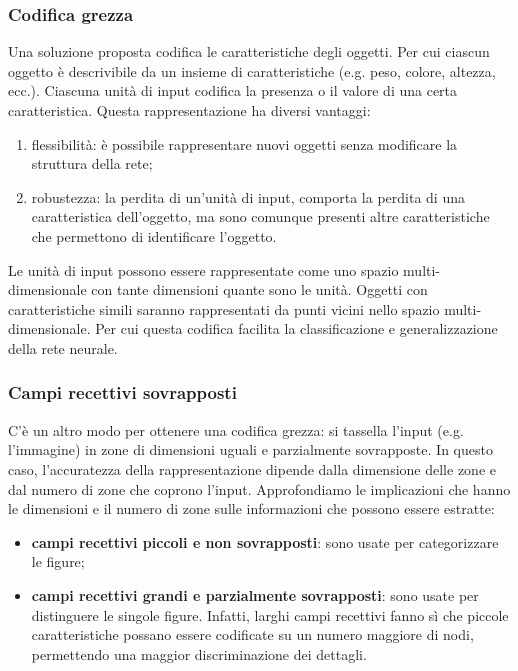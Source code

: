 \subsubsection{Codifica grezza}

Una soluzione proposta codifica le caratteristiche degli oggetti. Per cui
ciascun oggetto è descrivibile da un insieme di caratteristiche (e.g. peso,
colore, altezza, ecc.). Ciascuna unità di input codifica la presenza o il valore
di una certa caratteristica. Questa rappresentazione ha diversi vantaggi:

\begin{enumerate}
	\item flessibilità: è possibile rappresentare nuovi oggetti senza modificare
	      la struttura della rete;

	\item robustezza: la perdita di un'unità di input, comporta la perdita di
	      una caratteristica dell'oggetto, ma sono comunque presenti altre
	      caratteristiche che permettono di identificare l'oggetto.
\end{enumerate}

Le unità di input possono essere rappresentate come uno spazio
multi-dimensionale con tante dimensioni quante sono le unità. Oggetti con
caratteristiche simili saranno rappresentati da punti vicini nello spazio
multi-dimensionale. Per cui questa codifica facilita la classificazione e
generalizzazione della rete neurale.

\subsubsection{Campi recettivi sovrapposti}

C'è un altro modo per ottenere una codifica grezza: si tassella l'input (e.g.
l'immagine) in zone di dimensioni uguali e parzialmente sovrapposte. In questo
caso, l'accuratezza della rappresentazione dipende dalla dimensione delle zone e
dal numero di zone che coprono l'input. Approfondiamo le implicazioni che hanno
le dimensioni e il numero di zone sulle informazioni che possono essere
estratte:
\begin{itemize}
	\item \textbf{campi recettivi piccoli e non sovrapposti}: sono usate per
	      categorizzare le figure;

	\item \textbf{campi recettivi grandi e parzialmente sovrapposti}: sono usate
	      per distinguere le singole figure. Infatti, larghi campi recettivi
	      fanno sì che piccole caratteristiche possano essere codificate su un
	      numero maggiore di nodi, permettendo una maggior discriminazione dei
	      dettagli.
\end{itemize}

